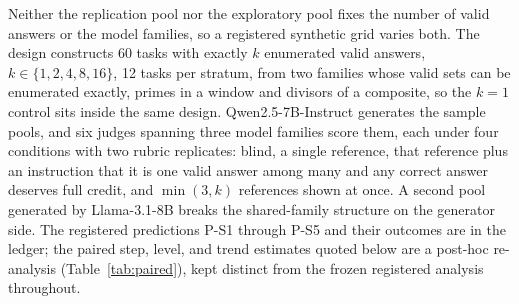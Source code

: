 \documentclass[11pt]{article}
\begin{document}
Neither the replication pool nor the exploratory pool fixes the number of valid answers or the model families, so a registered synthetic grid varies both.
The design constructs 60 tasks with exactly $k$ enumerated valid answers, $k \in \{1, 2, 4, 8, 16\}$, 12 tasks per stratum, from two families whose valid sets can be enumerated exactly, primes in a window and divisors of a composite, so the $k{=}1$ control sits inside the same design.
Qwen2.5-7B-Instruct generates the sample pools, and six judges spanning three model families score them, each under four conditions with two rubric replicates: blind, a single reference, that reference plus an instruction that it is one valid answer among many and any correct answer deserves full credit, and $\min(3, k)$ references shown at once.
A second pool generated by Llama-3.1-8B breaks the shared-family structure on the generator side.
The registered predictions P-S1 through P-S5 and their outcomes are in the ledger; the paired step, level, and trend estimates quoted below are a post-hoc re-analysis (Table~\ref{tab:paired}), kept distinct from the frozen registered analysis throughout.
\end{document}
